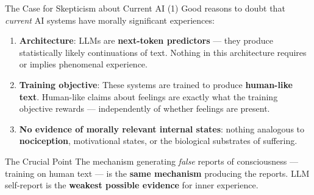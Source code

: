 \documentclass[aspectratio=169,11pt]{beamer}
\begin{document}
\begin{frame}[shrink=5]{The Case for Skepticism about Current AI (1)}
Good reasons to doubt that \emph{current} AI systems have morally significant experiences:

\vspace{0.15cm}
\begin{enumerate}
    \item \textbf{Architecture}: LLMs are \textbf{next-token predictors} --- they produce statistically likely continuations of text. Nothing in this architecture requires or implies phenomenal experience.

    \vspace{0.1cm}
    \item \textbf{Training objective}: These systems are trained to produce \textbf{human-like text}. Human-like claims about feelings are exactly what the training objective rewards --- independently of whether feelings are present.

    \vspace{0.1cm}
    \item \textbf{No evidence of morally relevant internal states}: nothing analogous to \textbf{nociception}, motivational states, or the biological substrates of suffering.
\end{enumerate}

\begin{alertblock}{The Crucial Point}
\scriptsize
The mechanism generating \emph{false} reports of consciousness --- training on human text --- is the \textbf{same mechanism} producing the reports. LLM self-report is the \textbf{weakest possible evidence} for inner experience.
\end{alertblock}
\end{frame}
\end{document}
